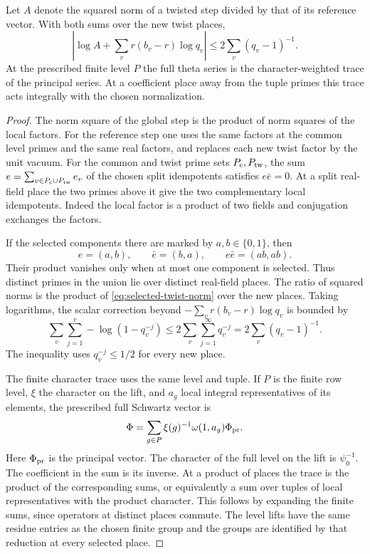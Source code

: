 \begin{lemma}\label{lem:twist-norm-trace}
Let \(A\) denote the squared norm of a twisted step divided by that of its reference vector. With both sums over the new twist places,
\[
 \left|\log A+\sum_v r(b_v-r)\log q_v\right|\le2\sum_v(q_v-1)^{-1}.
\]
 At the prescribed finite level \(P\) the
full theta series is the character-weighted trace of the principal
series. At a coefficient place away from the tuple primes this trace
acts integrally with the chosen normalization.
\end{lemma}

\begin{proof}
The norm square of the global step is the product of
norm squares of the local factors. For the reference step
one uses the same factors at the common level primes and the
same real factors, and replaces each new twist factor by
the unit vacuum. For the common and twist prime sets
\(P_{\rm c},P_{\rm tw}\), the sum
\(e=\sum_{v\in P_{\rm c}\cup P_{\rm tw}} e_v\) of the chosen
split idempotents satisfies \(e\bar e=0\).
At a split real-field place the two primes above it give the
two complementary local idempotents. Indeed the local factor is a product of two fields and conjugation
exchanges the factors.

If the selected components there are marked
by \(a,b\in\{0,1\}\), then
\[
 e=(a,b),\qquad\bar e=(b,a),\qquad e\bar e=(ab,ab).
\]
Their product vanishes only when at most one component is selected. Thus
distinct primes in the union lie over distinct real-field places.
The ratio of squared norms is the product of
\eqref{eq:selected-twist-norm} over the new places. Taking
logarithms, the scalar correction beyond
\(-\sum_v r(b_v-r)\log q_v\) is bounded by
\[
 \sum_v\sum_{j=1}^r -\log(1-q_v^{-j})
  \le2\sum_v\sum_{j=1}^\infty q_v^{-j}
  =2\sum_v (q_v-1)^{-1}.
\]
The inequality uses \(q_v^{-j}\le1/2\) for every new place.
\label{cor:selected-norms-1}

The finite character trace uses the same level and tuple.
If \(P\) is the finite row level, \(\xi\) the character
on the lift, and \(a_g\) local integral representatives of
its elements, the prescribed full Schwartz vector is
\[
          \Phi=\sum_{g\in P}\xi(g)^{-1}
                         \omega(1,a_g)\Phi_{\rm pr}.
\]
Here \(\Phi_{\rm pr}\) is the principal vector. The character
of the full level on the lift is \(\psi_0^{-1}\). The
coefficient in the sum is its inverse. At a product of
places the trace is the product of the corresponding sums,
or equivalently a sum over tuples of local representatives
with the product character. This follows by expanding the
finite sums, since operators at distinct places commute.
The level lifts have the same residue entries as the
chosen finite group and the groups are identified by that
reduction at every selected place.


\end{proof}
